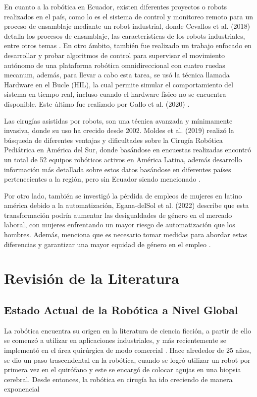 \documentclass[conference]{IEEEtran}
\begin{document}
En cuanto a la robótica en Ecuador, existen diferentes proyectos o robots realizados en el país, como lo es el sistema de control y monitoreo remoto para un proceso de ensamblaje mediante un robot industrial, donde Cevallos et al. (2018) detalla los procesos de ensamblaje, las características de los robots industriales, entre otros temas \cite{Cevalloss2018}. En otro ámbito, también fue realizado un trabajo enfocado en desarrollar y probar algoritmos de control para supervisar el movimiento autónomo de una plataforma robótica omnidireccional con cuatro ruedas mecanum, además, para llevar a cabo esta tarea, se usó la técnica llamada Hardware en el Bucle (HIL), la cual permite simular el comportamiento del sistema en tiempo real, incluso cuando el hardware físico no se encuentra disponible. Este último fue realizado por Gallo et al. (2020) \cite{Gallo}.

Las cirugías asistidas por robots, son una técnica avanzada y mínimamente invasiva, donde su uso ha crecido desde 2002. Moldes et al. (2019) realizó la búsqueda de diferentes ventajas y dificultades sobre la Cirugía Robótica Pediátrica en América del Sur, donde basándose en encuestas realizadas encontró un total de 52 equipos robóticos activos en América Latina, además desarrollo información más detallada sobre estos datos basándose en diferentes países pertenecientes a la región, pero sin Ecuador siendo mencionado \cite{Moldes}.

Por otro lado, también se investigó la pérdida de empleos de mujeres en latino américa debido a la automatización, Egana-delSol et al. (2022) describe que esta transformación podría aumentar las desigualdades de género en el mercado laboral, con mujeres enfrentando un mayor riesgo de automatización que los hombres. Además, menciona que es necesario tomar medidas para abordar estas diferencias y garantizar una mayor equidad de género en el empleo \cite{Egana}.

\section{Revisión de la Literatura}
\subsection{Estado Actual de la Robótica a Nivel Global}
La robótica encuentra su origen en la literatura de ciencia ficción, a partir de ello se comenzó a utilizar en aplicaciones industriales, y más recientemente se implementó en el área quirúrgica de modo comercial \cite{Hockstein2007}. Hace alrededor de 25 años, se dio un paso trascendental en la robótica, cuando se logró utilizar un robot por primera vez en el quirófano y este se encargó de colocar agujas en una biopsia cerebral. Desde entonces, la robótica en cirugía ha ido creciendo de manera exponencial \cite{Shah2015}
\end{document}
